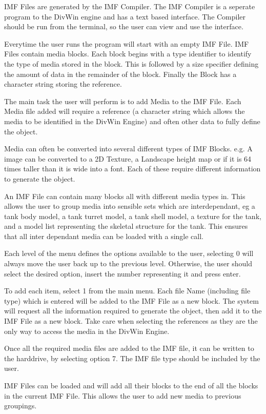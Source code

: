 IMF Files are generated by the IMF Compiler. The IMF Compiler is a seperate program to the DivWin engine and has a text based interface. The Compiler should be run from the terminal, so the user can view and use the interface.

Everytime the user runs the program will start with an empty IMF File. IMF Files contain media blocks. Each block begins with a type identifier to identify the type of media stored in the block. This is followed by a size specifier defining the amount of data in the remainder of the block. Finally the Block has a character string storing the reference.\par
 The main task the user will perform is to add Media to the IMF File. Each Media file added will require a reference (a character string which allows the media to be identified in the DivWin Engine) and often other data to fully define the object.\par
 Media can often be converted into several different types of IMF Blocks. e.g. A image can be converted to a 2D Texture, a Landscape height map or if it is 64 times taller than it is wide into a font. Each of these require different information to generate the object.\par
 An IMF File can contain many blocks all with different media types in. This allows the user to group media into sensible sets which are interdependant, eg a tank body model, a tank turret model, a tank shell model, a texture for the tank, and a model list representing the skeletal structure for the tank. This ensures that all inter dependant media can be loaded with a single call.\par
 Each level of the menu defines the options available to the user, selecting 0 will always move the user back up to the previous level. Otherwise, the user should select the desired option, insert the number representing it and press enter.\par


To add each item, select 1 from the main menu. Each file Name (including file type) which is entered will be added to the IMF File as a new block. The system will request all the information required to generate the object, then add it to the IMF File as a new block. Take care when selecting the references as they are the only way to access the media in the DivWin Engine.\par
 Once all the required media files are added to the IMF file, it can be written to the harddrive, by selecting option 7. The IMF file type should be included by the user.\par
 IMF Files can be loaded and will add all their blocks to the end of all the blocks in the current IMF File. This allows the user to add new media to previous groupings.\par


